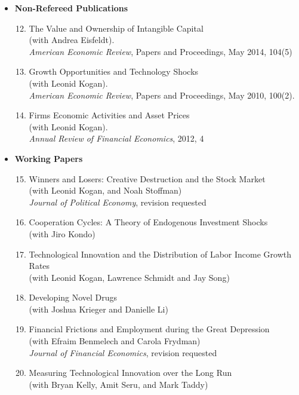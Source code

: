 \documentclass[11pt,letterpaper,serif,overlapped]{res}
\begin{document}
\begin{resume}
\begin{itemize}
\vspace{0.5cm}
\item \textbf{Non-Refereed Publications}
\begin{enumerate}
\setcounter{enumi}{11}
\item The Value and Ownership of Intangible Capital\\ (with Andrea Eisfeldt). \\
\emph{American Economic Review}, Papers and Proceedings, May 2014, 104(5)
\item Growth Opportunities and Technology Shocks\\ (with Leonid Kogan). \\
\emph{American Economic Review}, Papers and Proceedings, May 2010, 100(2).
\item Firms Economic Activities and Asset Prices\\ (with Leonid Kogan). \\
\emph{Annual Review of Financial Economics}, 2012, 4
\end{enumerate}

\vspace{0.5cm}
\item \textbf{Working Papers}
\begin{enumerate}
\setcounter{enumi}{14}
\item Winners and Losers: Creative Destruction and the Stock Market\\ (with Leonid Kogan, and Noah Stoffman)\\\emph{Journal of Political Economy}, revision requested
\item Cooperation Cycles: A Theory of Endogenous Investment Shocks\\ (with Jiro Kondo)
\item Technological Innovation and the Distribution of Labor Income Growth Rates\\ (with Leonid Kogan, Lawrence Schmidt and Jay Song)
\item Developing Novel Drugs\\(with Joshua Krieger and Danielle Li)
\item Financial Frictions and Employment during the Great Depression\\ (with Efraim Benmelech and Carola Frydman)\\\emph{Journal of Financial Economics}, revision requested
\item Measuring Technological Innovation over the Long Run\\ (with Bryan Kelly, Amit Seru, and Mark Taddy)
\end{enumerate}


\end{itemize}
\end{resume}
\end{document}
